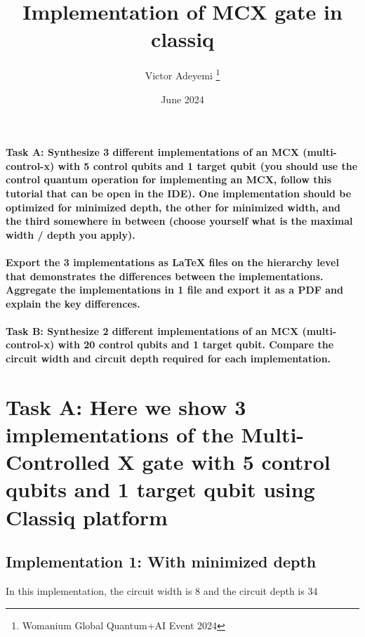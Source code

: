 \documentclass[12pt, letterpaper]{article}
\title{Implementation of MCX gate in classiq}
\author{Victor Adeyemi \thanks{Womanium Global Quantum+AI Event 2024}}
\date{June 2024}
\begin{document}
\maketitle

\paragraph{
Task A: Synthesize 3 different implementations of an MCX (multi-control-x) with 5 control qubits and 1 target qubit (you should use the control quantum operation for implementing an MCX, follow this tutorial that can be open in the IDE). One implementation should be optimized for minimized depth, the other for minimized width, and the third somewhere in between (choose yourself what is the maximal width / depth you apply).}

\paragraph{
Export the 3 implementations as LaTeX files on the hierarchy level that demonstrates the differences between the implementations. Aggregate the implementations in 1 file and export it as a PDF and explain the key differences.}

\paragraph{
Task B: Synthesize 2 different implementations of an MCX (multi-control-x) with 20 control qubits and 1 target qubit. Compare the circuit width and circuit depth required for each implementation.
}

\newpage{}
\section{Task A: Here we show 3 implementations of the Multi-Controlled X gate with 5 control qubits and 1 target qubit using Classiq platform}

\subsection{Implementation 1: With minimized depth}

In this implementation, the circuit width is 8 and the circuit depth is 34
\end{document}
